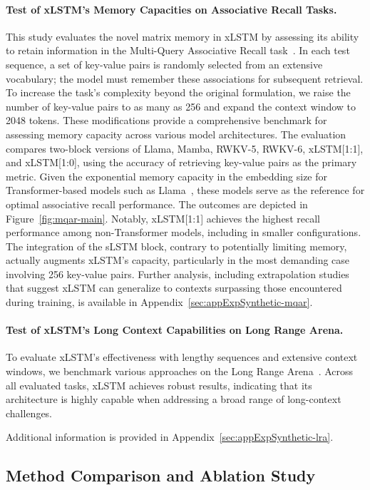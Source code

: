 \paragraph{Test of xLSTM's Memory Capacities on Associative Recall Tasks.} This study evaluates the novel matrix memory in xLSTM by assessing its ability to retain information in the Multi-Query Associative Recall task~\citep{Arora:23arxiv}. In each test sequence, a set of key-value pairs is randomly selected from an extensive vocabulary; the model must remember these associations for subsequent retrieval. To increase the task's complexity beyond the original formulation, we raise the number of key-value pairs to as many as 256 and expand the context window to 2048 tokens. These modifications provide a comprehensive benchmark for assessing memory capacity across various model architectures. The evaluation compares two-block versions of Llama, Mamba, RWKV-5, RWKV-6, xLSTM[1:1], and xLSTM[1:0], using the accuracy of retrieving key-value pairs as the primary metric. Given the exponential memory capacity in the embedding size for Transformer-based models such as Llama~\citep{Ramsauer:21}, these models serve as the reference for optimal associative recall performance. The outcomes are depicted in Figure~\ref{fig:mqar-main}. Notably, xLSTM[1:1] achieves the highest recall performance among non-Transformer models, including in smaller configurations. The integration of the sLSTM block, contrary to potentially limiting memory, actually augments xLSTM's capacity, particularly in the most demanding case involving 256 key-value pairs. Further analysis, including extrapolation studies that suggest xLSTM can generalize to contexts surpassing those encountered during training, is available in Appendix~\ref{sec:appExpSynthetic-mqar}.

\paragraph{Test of xLSTM's Long Context Capabilities on Long Range Arena.} To evaluate xLSTM's effectiveness with lengthy sequences and extensive context windows, we benchmark various approaches on the Long Range Arena~\citep{Tay:21}. Across all evaluated tasks, xLSTM achieves robust results, indicating that its architecture is highly capable when addressing a broad range of long-context challenges.

Additional information is provided in Appendix~\ref{sec:appExpSynthetic-lra}.

\subsection{Method Comparison and Ablation Study}
\label{sec:ExpComparison}

